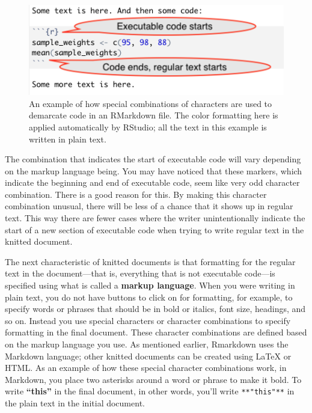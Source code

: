 \documentclass[]{tufte-book}
\begin{document}
\begin{figure}
\includegraphics[width=\textwidth]{figures/demarcating_code} \caption[An example of how special combinations of characters are used to demarcate code in an RMarkdown file]{An example of how special combinations of characters are used to demarcate code in an RMarkdown file. The color formatting here is applied automatically by RStudio; all the text in this example is written in plain text.}\label{fig:demarcatecode}
\end{figure}

The combination that indicates the start of executable code will vary depending
on the markup language being.
You may have noticed that these markers, which indicate the beginning and end of
executable code, seem like very odd character combination. There is a good
reason for this. By making this character combination unusual, there will be
less of a chance that it shows up in regular text. This way there are fewer
cases where the writer unintentionally indicate the start of a new section of
executable code when trying to write regular text in the knitted document.

The next characteristic of knitted documents is that formatting for the regular
text in the document---that is, everything that is not executable code---is
specified using what is called a \textbf{markup language}. When you were writing in
plain text, you do not have buttons to click on for formatting, for example, to
specify words or phrases that should be in bold or italics, font size, headings,
and so on. Instead you use special characters or character combinations to
specify formatting in the final document. These character combinations are
defined based on the markup language you use. As mentioned earlier, Rmarkdown
uses the Markdown language; other knitted documents can be created using LaTeX
or HTML. As an example of how these special character combinations work, in
Markdown, you place two asterisks around a word or phrase to make it bold. To
write \textbf{``this''} in the final document, in other words, you'll write
\texttt{**"this"**} in the plain text in the initial document.
\end{document}
